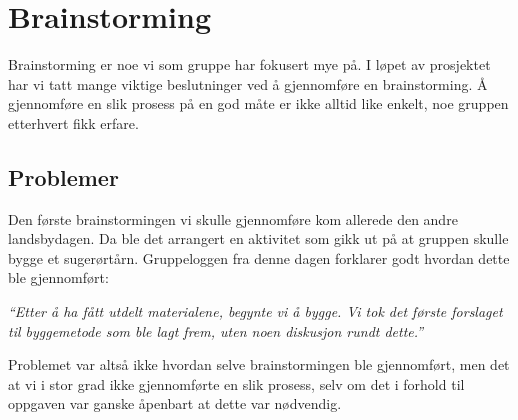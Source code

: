 \section{Brainstorming}
Brainstorming er noe vi som gruppe har fokusert mye på. I løpet av prosjektet har vi tatt mange viktige beslutninger ved å gjennomføre en brainstorming. Å gjennomføre en slik prosess på en god måte er ikke alltid like enkelt, noe gruppen etterhvert fikk erfare.
\subsection{Problemer}
Den første brainstormingen vi skulle gjennomføre kom allerede den andre landsbydagen. Da ble det arrangert en aktivitet som gikk ut på at gruppen skulle bygge et sugerørtårn. Gruppeloggen fra denne dagen forklarer godt hvordan dette ble gjennomført:\newline

\emph{“Etter å ha fått utdelt materialene, begynte vi å bygge. Vi tok det første forslaget til byggemetode som ble lagt frem, uten noen diskusjon rundt dette.”} \newline

Problemet var altså ikke hvordan selve brainstormingen ble gjennomført, men det at vi i stor grad ikke gjennomførte en slik prosess, selv om det i forhold til oppgaven var ganske åpenbart at dette var nødvendig. 



